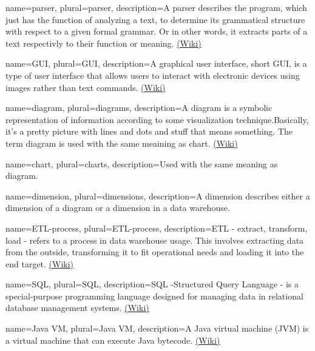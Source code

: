 {
  name=parser,
  plural=parser,
  description={A parser describes the program, which just has the function of analyzing a text, 
  to determine its grammatical structure with respect to a given formal grammar. Or in other words,
  it extracts parts of a text respectivly to their function or meaning. 
  \href{https://en.wikipedia.org/wiki/Parser}{(Wiki)} }
}


{
  name=GUI,
  plural=GUI,
  description={A graphical user interface, short GUI, is a type of user interface 
  that allows users to interact with electronic devices using images rather 
  than text commands. \href{https://en.wikipedia.org/wiki/Graphical_user_interface}{(Wiki)}}
}


{
  name=diagram,
  plural=diagrams,
  description={A diagram is a symbolic representation of information according to some
  visualization technique.Basically, it's a pretty picture with lines and dots and stuff
  that means something. The term diagram is used with the same meaining as \gls{chart}.
  \href{https://en.wikipedia.org/wiki/Diagram}{(Wiki)}}
}


{
  name=chart,
  plural=charts,
  description={Used with the same meaning as \gls{diagram}.}
}


{
  name=dimension,
  plural=dimensions,
  description={A dimension describes either a dimension of a \gls{diagram} or a dimension in a
  \gls{data warehouse}.  }
}


{
  name=ETL-process,
  plural=ETL-process,
  description={ETL - extract, transform, load - refers to a process in \gls{data warehouse} usage. This involves
  extracting data from the outside, transforming it to fit operational needs and loading it into the end target.
 \href{https://de.wikipedia.org/wiki/ETL-Prozess}{(Wiki)}}
}


{
  name=SQL,
  plural=SQL,
  description={SQL -Structured Query Language - is a special-purpose programming language designed for 
  managing data in relational \gls{database} management systems. \href{https://en.wikipedia.org/wiki/Sql}{(Wiki)}}
}


{
  name=Java VM,
  plural=Java VM,
  description={A Java virtual machine (JVM) is a virtual machine that can execute Java bytecode. 
  \href{https://en.wikipedia.org/wiki/Java_virtual_machine}{(Wiki)}}
}


